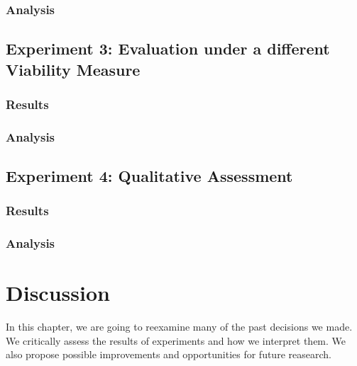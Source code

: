 \documentclass[12pt,a4paper]{report}
\begin{document}
\subsection{Analysis}




\section{Experiment 3: Evaluation under a different Viability Measure}
\subsection{Results}

\subsection{Analysis}


\section{Experiment 4: Qualitative Assessment}
\subsection{Results}

\subsection{Analysis}



\chapter{Discussion}
\label{ch:dicussion}
In this chapter, we are going to reexamine many of the past decisions we made. We critically assess the results of experiments and how we interpret them. We also propose possible improvements and opportunities for future reasearch.
\end{document}
